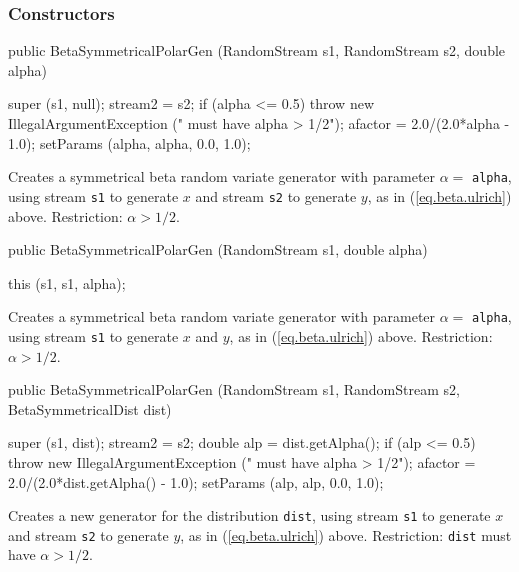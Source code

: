 \subsubsection* {Constructors}

\begin{code}

   public BetaSymmetricalPolarGen (RandomStream s1, RandomStream s2,
                                   double alpha) \begin{hide} {
      super (s1, null);
      stream2 = s2;
      if (alpha <= 0.5)
         throw new IllegalArgumentException ("  must have alpha > 1/2");
      afactor = 2.0/(2.0*alpha - 1.0);
      setParams (alpha, alpha, 0.0, 1.0);
   }\end{hide}
\end{code}
\begin{tabb} Creates a symmetrical beta random variate generator with
 parameter $\alpha =$ \texttt{alpha},  using stream \texttt{s1} to generate $x$
  and stream \texttt{s2} to generate $y$, as in
(\ref{eq.beta.ulrich}) above. Restriction: $\alpha > 1/2$.
\end{tabb}
\begin{code}

   public BetaSymmetricalPolarGen (RandomStream s1, double alpha) \begin{hide} {
      this (s1, s1, alpha);
   }\end{hide}
\end{code}
\begin{tabb} Creates a symmetrical beta random variate generator with
 parameter $\alpha =$ \texttt{alpha},  using stream \texttt{s1} to generate $x$
 and $y$, as in (\ref{eq.beta.ulrich}) above.  Restriction: $\alpha > 1/2$.
\end{tabb}
\begin{code}

   public BetaSymmetricalPolarGen (RandomStream s1, RandomStream s2,
                                   BetaSymmetricalDist dist) \begin{hide} {
      super (s1, dist);
      stream2 = s2;
      double alp = dist.getAlpha();
      if (alp <= 0.5)
         throw new IllegalArgumentException ("  must have alpha > 1/2");
      afactor = 2.0/(2.0*dist.getAlpha() - 1.0);
      setParams (alp, alp, 0.0, 1.0);
   }\end{hide}
\end{code}
  \begin{tabb}  Creates a new generator for the distribution \texttt{dist}, using
   stream \texttt{s1} to generate $x$ and stream \texttt{s2} to generate $y$,
   as in (\ref{eq.beta.ulrich}) above.
    Restriction: \texttt{dist} must have $\alpha > 1/2$.
  \end{tabb}
